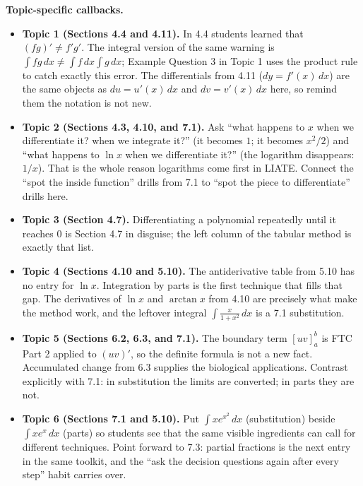 \documentclass[11pt]{article}
\begin{document}
\begin{bridgebox}
\medskip
\textbf{Topic-specific callbacks.}
\begin{itemize}
\item \textbf{Topic 1 (Sections 4.4 and 4.11).} In 4.4 students learned that $(fg)'\neq f'g'$. The integral version of the same warning is $\int fg\,dx \neq \int f\,dx\int g\,dx$; Example Question 3 in Topic 1 uses the product rule to catch exactly this error. The differentials from 4.11 ($dy=f'(x)\,dx$) are the same objects as $du=u'(x)\,dx$ and $dv=v'(x)\,dx$ here, so remind them the notation is not new.
\item \textbf{Topic 2 (Sections 4.3, 4.10, and 7.1).} Ask ``what happens to $x$ when we differentiate it? when we integrate it?'' (it becomes $1$; it becomes $x^2/2$) and ``what happens to $\ln x$ when we differentiate it?'' (the logarithm disappears: $1/x$). That is the whole reason logarithms come first in LIATE. Connect the ``spot the inside function'' drills from 7.1 to ``spot the piece to differentiate'' drills here.
\item \textbf{Topic 3 (Section 4.7).} Differentiating a polynomial repeatedly until it reaches $0$ is Section 4.7 in disguise; the left column of the tabular method is exactly that list.
\item \textbf{Topic 4 (Sections 4.10 and 5.10).} The antiderivative table from 5.10 has no entry for $\ln x$. Integration by parts is the first technique that fills that gap. The derivatives of $\ln x$ and $\arctan x$ from 4.10 are precisely what make the method work, and the leftover integral $\int\frac{x}{1+x^2}\,dx$ is a 7.1 substitution.
\item \textbf{Topic 5 (Sections 6.2, 6.3, and 7.1).} The boundary term $[uv]_a^b$ is FTC Part 2 applied to $(uv)'$, so the definite formula is not a new fact. Accumulated change from 6.3 supplies the biological applications. Contrast explicitly with 7.1: in substitution the limits are converted; in parts they are not.
\item \textbf{Topic 6 (Sections 7.1 and 5.10).} Put $\int xe^{x^2}\,dx$ (substitution) beside $\int xe^{x}\,dx$ (parts) so students see that the same visible ingredients can call for different techniques. Point forward to 7.3: partial fractions is the next entry in the same toolkit, and the ``ask the decision questions again after every step'' habit carries over.
\end{itemize}
\end{bridgebox}

\end{document}
